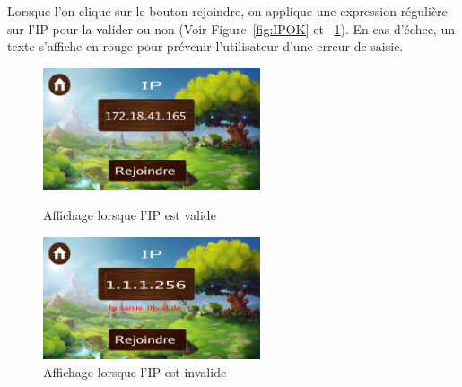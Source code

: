 \documentclass[11pt]{article}
\begin{document}
                Lorsque l’on clique sur le bouton rejoindre, on applique une expression régulière sur l’IP pour la valider ou non (Voir Figure~\ref{fig:IPOK} et ~\ref{fig:IPKO}). En cas d’échec, un texte s’affiche en rouge pour prévenir l’utilisateur d’une erreur de saisie.\\
                \begin{figure}[H]
                    \centering
                    \begin{minipage}{0.45\textwidth}
                        \centering
                        \includegraphics[height=3.6cm]{screenIpOk.png}
                        \caption{Affichage lorsque l'IP est valide}
                        \label{fig:IPOK}
                    \end{minipage}
                    \hfill
                    \begin{minipage}{0.45\textwidth}
                        \centering
                        \includegraphics[height=3.6cm]{screenIpKo.png}
                        \caption{Affichage lorsque l'IP est invalide}
                        \label{fig:IPKO}
                    \end{minipage}
                \end{figure}
\end{document}
